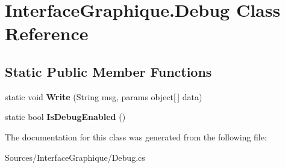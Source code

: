 \hypertarget{class_interface_graphique_1_1_debug}{}\section{Interface\+Graphique.\+Debug Class Reference}
\label{class_interface_graphique_1_1_debug}
\subsection*{Static Public Member Functions}
\begin{DoxyCompactItemize}
\item 
\hypertarget{class_interface_graphique_1_1_debug_a540c6c5d53e75f5710492b0254eaf0a3}{}static void {\bfseries Write} (String msg, params object\mbox{[}$\,$\mbox{]} data)\label{class_interface_graphique_1_1_debug_a540c6c5d53e75f5710492b0254eaf0a3}

\item 
\hypertarget{class_interface_graphique_1_1_debug_a86721cc22d894c08f05abfb82e07f494}{}static bool {\bfseries Is\+Debug\+Enabled} ()\label{class_interface_graphique_1_1_debug_a86721cc22d894c08f05abfb82e07f494}

\end{DoxyCompactItemize}


The documentation for this class was generated from the following file\+:\begin{DoxyCompactItemize}
\item 
Sources/\+Interface\+Graphique/Debug.\+cs\end{DoxyCompactItemize}
